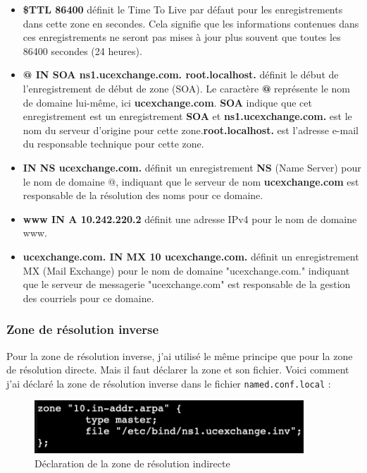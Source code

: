 \documentclass[12pt, a4paper]{article}
\begin{document}
    \begin{itemize}
        \item \textbf{\$TTL 86400} définit le Time To Live par défaut pour les enregistrements dans cette zone en secondes. Cela signifie que les informations contenues dans ces enregistrements ne seront pas mises à jour plus souvent que toutes les 86400 secondes (24 heures).\\
        \item \textbf{@ IN SOA ns1.ucexchange.com. root.localhost.} définit le début de l'enregistrement de début de zone (SOA). Le caractère \textbf{@} représente le nom de domaine lui-même, ici \textbf{ucexchange.com}. \textbf{SOA} indique que cet enregistrement est un enregistrement \textbf{SOA} et \textbf{ns1.ucexchange.com.} est le nom du serveur d'origine pour cette zone.\textbf{root.localhost.} est l'adresse e-mail du responsable technique pour cette zone.\\
        \item \textbf{IN NS ucexchange.com.} définit un enregistrement \textbf{NS} (Name Server) pour le nom de domaine @, indiquant que le serveur de nom \textbf{ucexchange.com} est responsable de la résolution des noms pour ce domaine.\\
        \item  \textbf{www IN A 10.242.220.2} définit une adresse IPv4 pour le nom de domaine www.\\
        \item  \textbf{ucexchange.com. IN MX 10 ucexchange.com.} définit un enregistrement MX (Mail Exchange) pour le nom de domaine "ucexchange.com." indiquant que le serveur de messagerie "ucexchange.com" est responsable de la gestion des courriels pour ce domaine.\\
    \end{itemize}
    \newpage

    \subsubsection{Zone de résolution inverse}
    Pour la zone de résolution inverse, j'ai utilisé le même principe que pour
    la zone de résolution directe. Mais il faut déclarer la zone et son fichier. 
    Voici comment j'ai déclaré la zone de résolution inverse dans le fichier
    \texttt{named.conf.local} :
    \begin{figure}[h]
		\centering
		\includegraphics[width=0.9\textwidth]{img/zone-inv.png}
		\caption{Déclaration de la zone de résolution indirecte}
		\label{fig:zone-inv}
	\end{figure}
\end{document}
